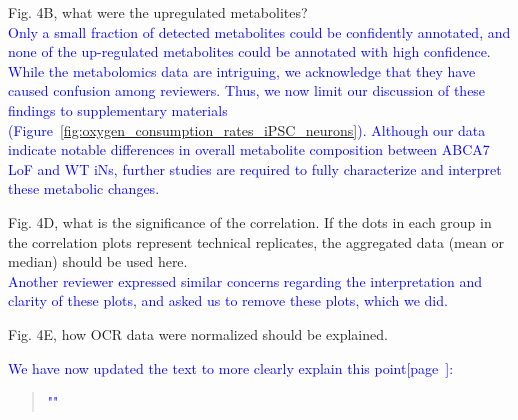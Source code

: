 \documentclass[12pt]{article}
\begin{document}
Fig. 4B, what were the upregulated metabolites?\\
\textcolor{blue}{Only a small fraction of detected metabolites could be confidently annotated, and none of the up-regulated metabolites could be annotated with high confidence. While the metabolomics data are intriguing, we acknowledge that they have caused confusion among reviewers. Thus, we now limit our discussion of these findings to supplementary materials (Figure~\ref{fig:oxygen_consumption_rates_iPSC_neurons}). Although our data indicate notable differences in overall metabolite composition between ABCA7 LoF and WT iNs, further studies are required to fully characterize and interpret these metabolic changes.} 

Fig. 4D, what is the significance of the correlation. If the dots in each group in the correlation plots represent technical replicates, the aggregated data (mean or median) should be used here.\\
\textcolor{blue}{Another reviewer expressed similar concerns regarding the interpretation and clarity of these plots, and asked us to remove these plots, which we did.}

Fig. 4E, how OCR data were normalized should be explained.

\textcolor{blue}{We have now updated the text to more clearly explain this point[page~\pageref{quoteC-label}]:}
\begin{quote}
	\textcolor{blue}{"\quoteC"}
\end{quote}
\end{document}
